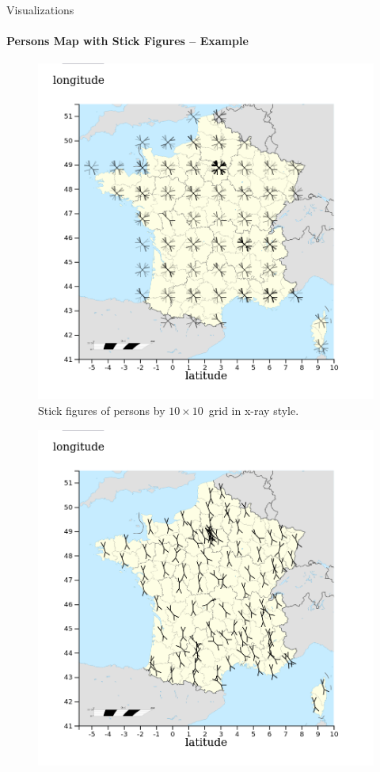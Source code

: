 \documentclass[english]{mlutalk}
\begin{document}
\begin{frame}{Visualizations}
  \framesubtitle{Persons Map with Stick Figures -- Example}
  \begin{minipage}{0.49\linewidth}
    \begin{figure}
      \centering
      \includegraphics[width=1\linewidth]{../report/figures/stick-figures-by-grid-10-10-xray}
      \caption{Stick figures of persons by \(10 \times 10\)~grid in x-ray style.}
    \end{figure}
  \end{minipage}
  \begin{minipage}{0.49\linewidth}
    \begin{figure}
      \centering
      \includegraphics[width=1\linewidth]{../report/figures/stick-figures-by-department-average}

\end{figure}
\end{minipage}
\end{frame}
\end{document}
